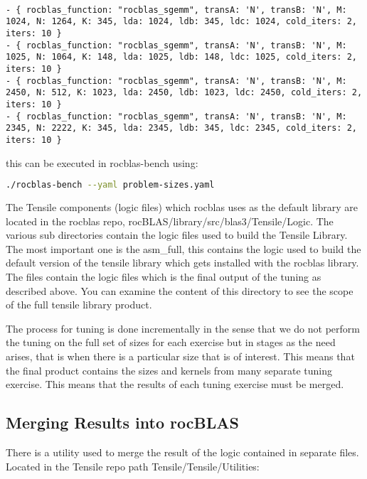 \documentclass[]{article}
\begin{document}
\begin{verbatim}

- { rocblas_function: "rocblas_sgemm", transA: 'N', transB: 'N', M: 1024, N: 1264, K: 345, lda: 1024, ldb: 345, ldc: 1024, cold_iters: 2, iters: 10 }
- { rocblas_function: "rocblas_sgemm", transA: 'N', transB: 'N', M: 1025, N: 1064, K: 148, lda: 1025, ldb: 148, ldc: 1025, cold_iters: 2, iters: 10 }
- { rocblas_function: "rocblas_sgemm", transA: 'N', transB: 'N', M: 2450, N: 512, K: 1023, lda: 2450, ldb: 1023, ldc: 2450, cold_iters: 2, iters: 10 }
- { rocblas_function: "rocblas_sgemm", transA: 'N', transB: 'N', M: 2345, N: 2222, K: 345, lda: 2345, ldb: 345, ldc: 2345, cold_iters: 2, iters: 10 }

\end{verbatim} 

this can be executed in rocblas-bench using:

\begin{lstlisting}[language=bash]
./rocblas-bench --yaml problem-sizes.yaml
\end{lstlisting}

The Tensile components (logic files) which rocblas uses as the default library are located in the rocblas repo, rocBLAS/library/src/blas3/Tensile/Logic. The various sub directories contain the logic files used to build the Tensile Library. The most important one is the asm\_full, this contains the logic used to build the default version of the tensile library which gets installed with the rocblas library. The files contain the logic files which is the final output of the tuning as described above. You can examine the content of this directory to see the scope of the full tensile library product. 

The process for tuning is done incrementally in the sense that we do not perform the tuning on the full set of sizes for each exercise but in stages as the need arises, that is when there is a particular size that is of interest. This means that the final product contains the sizes and kernels from many separate tuning exercise. This means that the results of each tuning exercise must be merged. 

\subsection{Merging Results into rocBLAS}

There is a utility used to merge the result of the logic contained in separate files. Located in the Tensile repo path Tensile/Tensile/Utilities:
\end{document}

